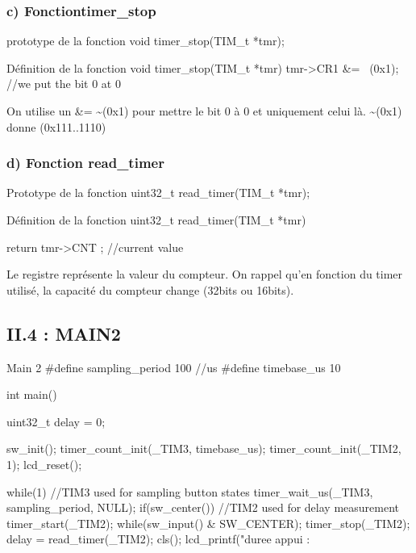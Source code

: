 



\subsubsection{c) Fonctiontimer\_stop}
\begin{Cpp}{prototype de la fonction } 
void timer_stop(TIM_t *tmr);
\end{Cpp}

\begin{Cpp}{Définition de la fonction } 
void timer_stop(TIM_t *tmr) {
    tmr->CR1 &= ~(0x1);  //we put the bit 0 at 0 
}
\end{Cpp}

On utilise un \&= \~{}(0x1) pour mettre le bit 0 à 0 et uniquement celui là.
\~{}(0x1) donne (0x111..1110)\\





\subsubsection{d) Fonction read\_timer}
\begin{Cpp}{Prototype de la fonction} 
uint32_t read_timer(TIM_t *tmr);
\end{Cpp}

\begin{Cpp}{Définition de la fonction} 
uint32_t read_timer(TIM_t *tmr) {

	return tmr->CNT ;	//current value
}
\end{Cpp}

Le registre  représente la valeur du compteur. On rappel qu'en fonction du timer utilisé, la capacité du compteur change (32bits ou 16bits).


\newpage
\subsection{II.4 : MAIN2}
\begin{Cpp}{Main 2} 
#define sampling_period 100         //us
#define timebase_us     10

int main()
{
    uint32_t delay = 0;
    
    sw_init();
    timer_count_init(_TIM3, timebase_us);
    timer_count_init(_TIM2, 1);
    lcd_reset();    
    
    while(1)
    {
        //TIM3 used for sampling button states
        timer_wait_us(_TIM3, sampling_period, NULL);
        if(sw_center())
        {
            //TIM2 used for delay measurement
            timer_start(_TIM2);
            while(sw_input() & SW_CENTER);
            timer_stop(_TIM2);
            delay = read_timer(_TIM2);
            cls();
            lcd_printf("duree appui : %
        }
    }        
}
\end{Cpp}

